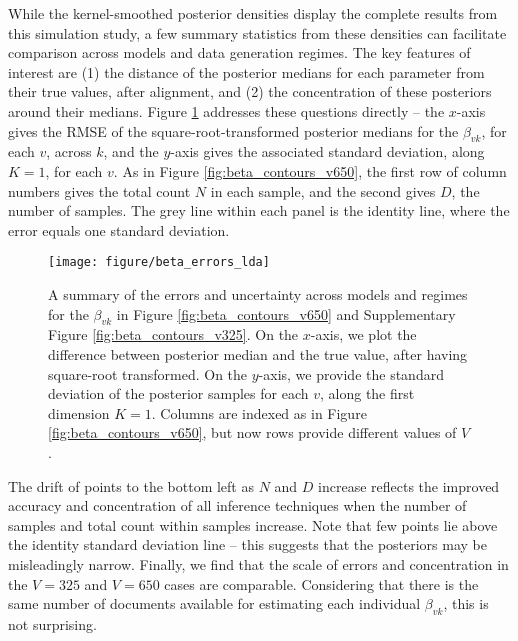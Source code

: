 \documentclass[oupdraft]{bio}
\begin{document}
While the kernel-smoothed posterior densities display the complete results from
this simulation study, a few summary statistics from these densities can
facilitate comparison across models and data generation regimes. The key
features of interest are (1) the distance of the posterior medians for each
parameter from their true values, after alignment, and (2) the concentration of
these posteriors around their medians. Figure \ref{fig:beta_errors_lda}
addresses these questions directly -- the $x$-axis gives the RMSE of the
square-root-transformed posterior medians for the $\beta_{vk}$, for each $v$,
across $k$, and the $y$-axis gives the associated standard deviation, along $K =
1$, for each $v$. As in Figure \ref{fig:beta_contours_v650}, the first row of
column numbers gives the total count $N$ in each sample, and the second gives
$D$, the number of samples. The grey line within each panel is the identity
line, where the error equals one standard deviation.

\begin{figure}[!p]
  \centering
  \texttt{[image: figure/beta\_errors\_lda]}
  \caption{A summary of the errors and uncertainty across models and regimes for
    the $\beta_{vk}$ in Figure \ref{fig:beta_contours_v650} and Supplementary
    Figure \ref{fig:beta_contours_v325}. On the $x$-axis, we plot the difference
    between posterior median and the true value, after having square-root
    transformed. On the $y$-axis, we provide the standard deviation of the
    posterior samples for each $v$, along the first dimension $K = 1$. Columns
    are indexed as in Figure \ref{fig:beta_contours_v650}, but now rows provide
    different values of $V$.
    \label{fig:beta_errors_lda} }
\end{figure}

The drift of points to the bottom left as $N$ and $D$ increase reflects the
improved accuracy and concentration of all inference techniques when the number
of samples and total count within samples increase. Note that few points lie
above the identity standard deviation line -- this suggests that the posteriors
may be misleadingly narrow. Finally, we find that the scale of errors and
concentration in the $V = 325$ and $V = 650$ cases are comparable. Considering
that there is the same number of documents available for estimating each
individual $\beta_{vk}$, this is not surprising.
\end{document}
